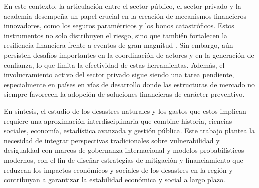 \documentclass[12pt, a4paper]{article}
\begin{document}
En este contexto, la articulación entre el sector público, el sector privado y la academia desempeña un papel crucial en la creación de mecanismos financieros innovadores, como los seguros paramétricos y los bonos catastróficos. Estos instrumentos no solo distribuyen el riesgo, sino que también fortalecen la resiliencia financiera frente a eventos de gran magnitud \cite{quesada2020}. Sin embargo, aún persisten desafíos importantes en la coordinación de actores y en la generación de confianza, lo que limita la efectividad de estas herramientas. Además, el involucramiento activo del sector privado sigue siendo una tarea pendiente, especialmente en países en vías de desarrollo donde las estructuras de mercado no siempre favorecen la adopción de soluciones financieras de carácter preventivo.  

En síntesis, el estudio de los desastres naturales y los gastos que estos implican requiere una aproximación interdisciplinaria que combine historia, ciencias sociales, economía, estadística avanzada y gestión pública. Este trabajo plantea la necesidad de integrar perspectivas tradicionales sobre vulnerabilidad y desigualdad con marcos de gobernanza internacional y modelos probabilísticos modernos, con el fin de diseñar estrategias de mitigación y financiamiento que reduzcan los impactos económicos y sociales de los desastres en la región y contribuyan a garantizar la estabilidad económica y social a largo plazo.  




\nocite{*}%

\end{document}
